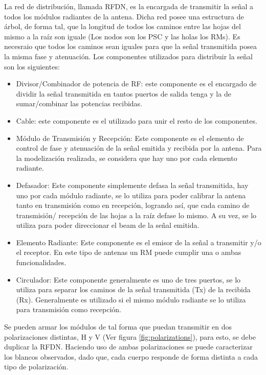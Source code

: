 La red de distribución, llamada RFDN, es la encargada de transmitir la señal a todos los módulos radiantes de la antena.
Dicha red posee una estructura de árbol, de forma tal, que la longitud de todos los caminos entre las hojas del mismo a
la raíz son iguale (Los nodos son los PSC y las holas los RMs). Es necesraio que todos los caminos sean iguales para que la
señal transmitida posea la misma fase y atenuación. Los componentes utilizados para distribuir la señal son los siguientes:

\begin{itemize}
	\item Divisor/Combinador de potencia de RF: este componente es el encargado de dividir la señal transmitida en tantos puertos de salida
		tenga y la de sumar/combinar las potencias recibidas.
	\item Cable: este componente es el utilizado para unir el resto de los componentes.
	\item Módulo de Transmisión y Recepción: Este componente es el elemento de control de fase y atenuación de la señal emitida y
    recibida por la antena. Para la modelización realizada, se considera que hay uno por cada elemento radiante.
	\item Defasador: Este componente simplemente defasa la señal transmitida, hay uno por cada módulo radiante, se lo utiliza
		para poder calibrar la antena tanto en transmisión como en recepción, logrando así, que cada camino de transmisión/
		recepción de las hojas a la raíz defase lo mismo. A su vez, se lo utiliza para poder direccionar el beam de la señal
		emitida.
	\item Elemento Radiante: Este componente es el emisor de la señal a transmitir y/o el receptor. En este tipo de antenas un
		RM puede cumplir una o ambas funcionalidades.
	\item Circulador: Este componente generalmente es uno de tres puertos, se lo utiliza para separar los caminos de la
		señal transmitida (Tx) de la recibida (Rx). Generalmente es utilizado si el mismo módulo radiante se lo utiliza para
		transmisión como recepción.
\end{itemize}

Se pueden armar los módulos de tal forma que puedan transmitir en dos polarizaciones distintas, H y V (Ver figura
\ref{fig:polarizations}), para esto, se debe duplicar la RFDN. Haciendo uso de ambas polarizaciones se puede caracterizar
los blancos observados, dado que, cada cuerpo responde de forma distinta a cada tipo de polarización.


